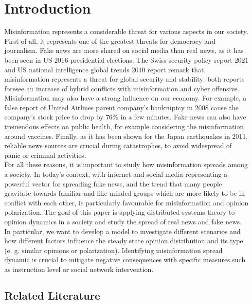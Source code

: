 \section{Introduction}

Misinformation represents a considerable threat for various aspects in our society. First of all, it represents one of the greatest threats for democracy and journalism\cite{Zhou2019}. Fake news are more shared on social media than real news, as it has been seen in US 2016 presidential elections\cite{Zhou2020}. The Swiss security policy report 2021\cite{swiss2021} and US national intelligence global trends 2040 report \cite{us2021} remark that misinformation represents a threat for global security and stability: both reports foresee an increase of hybrid conflicts with misinformation and cyber offensive. Misinformation may also have a strong influence on our economy. For example, a false report of United Airlines parent company's bankruptcy in 2008 cause the company's stock price to drop by 76$\%$ in a few minutes\cite{carvalho2011}. Fake news can also have tremendous effects on public health, for example considering the misinformation around vaccines\cite{Larson2017}. Finally, as it has been shown for the Japan earthquakes in 2011\cite{Hashimoto2021}, reliable news sources are crucial during catastrophes, to avoid widespread of panic or criminal activities.\\

For all these reasons, it is important to study how misinformation spreads among a society. In today's context, with internet and social media representing a powerful vector for spreading fake news, and the trend that many people gravitate towards familiar and like-minded groups which are more likely to be in conflict with each other, is particularly favourable for misinformation and opinion polarization\cite{us2021}. The goal of this paper is applying distributed systems theory to opinion dynamics in a society and study the spread of real news and fake news. In particular, we want to develop a model to investigate different scenarios and how different factors influence the steady state opinion distribution and its type (e. g. similar opinions or polarization).
Identifying misinformation spread dynamic is crucial to mitigate negative consequences with specific measures such as instruction level\cite{joanna2017} or social network intervention\cite{mahak2020}.


\subsection{Related Literature}

